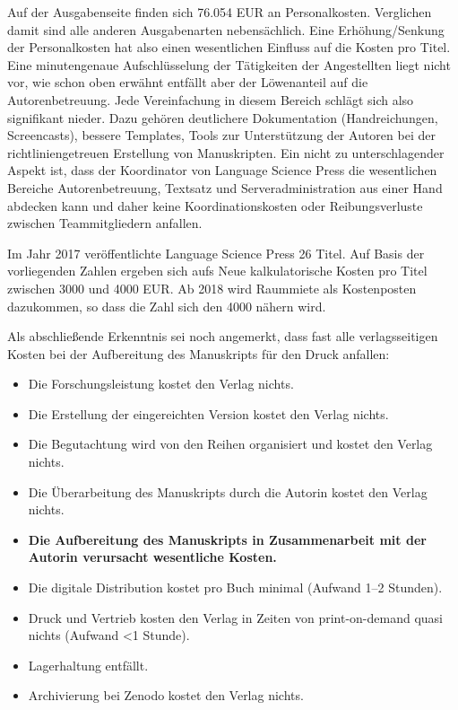 \documentclass[a4paper,
fontsize=11pt,
oneside,
numbers=noperiodatend,
parskip=half-,
bibliography=totoc,
final
]{scrartcl}
\begin{document}
Auf der Ausgabenseite finden sich 76.054 EUR an Personalkosten.
Verglichen damit sind alle anderen Ausgabenarten nebensächlich. Eine
Erhöhung/Senkung der Personalkosten hat also einen wesentlichen Einfluss
auf die Kosten pro Titel. Eine minutengenaue Aufschlüsselung der
Tätigkeiten der Angestellten liegt nicht vor, wie schon oben erwähnt
entfällt aber der Löwenanteil auf die Autorenbetreuung. Jede
Vereinfachung in diesem Bereich schlägt sich also signifikant nieder.
Dazu gehören deutlichere Dokumentation (Handreichungen, Screencasts),
bessere Templates, Tools zur Unterstützung der Autoren bei der
richtliniengetreuen Erstellung von Manuskripten. Ein nicht zu
unterschlagender Aspekt ist, dass der Koordinator von Language Science
Press die wesentlichen Bereiche Autorenbetreuung, Textsatz und
Serveradministration aus einer Hand abdecken kann und daher keine
Koordinationskosten oder Reibungsverluste zwischen Teammitgliedern
anfallen.

Im Jahr 2017 veröffentlichte Language Science Press 26 Titel. Auf Basis
der vorliegenden Zahlen ergeben sich aufs Neue kalkulatorische Kosten
pro Titel zwischen 3000 und 4000 EUR. Ab 2018 wird Raummiete als
Kostenposten dazukommen, so dass die Zahl sich den 4000 nähern wird.

Als abschließende Erkenntnis sei noch angemerkt, dass fast alle
verlagsseitigen Kosten bei der Aufbereitung des Manuskripts für den
Druck anfallen:

\begin{itemize}
\item
  Die Forschungsleistung kostet den Verlag nichts.
\item
  Die Erstellung der eingereichten Version kostet den Verlag nichts.
\item
  Die Begutachtung wird von den Reihen organisiert und kostet den Verlag
  nichts.
\item
  Die Überarbeitung des Manuskripts durch die Autorin kostet den Verlag
  nichts.
\item
  \textbf{Die Aufbereitung des Manuskripts in Zusammenarbeit mit der
  Autorin verursacht wesentliche Kosten.}
\item
  Die digitale Distribution kostet pro Buch minimal (Aufwand 1--2
  Stunden).
\item
  Druck und Vertrieb kosten den Verlag in Zeiten von print-on-demand
  quasi nichts (Aufwand \textless1 Stunde).
\item
  Lagerhaltung entfällt.
\item
  Archivierung bei Zenodo kostet den Verlag nichts.
\end{itemize}
\end{document}
